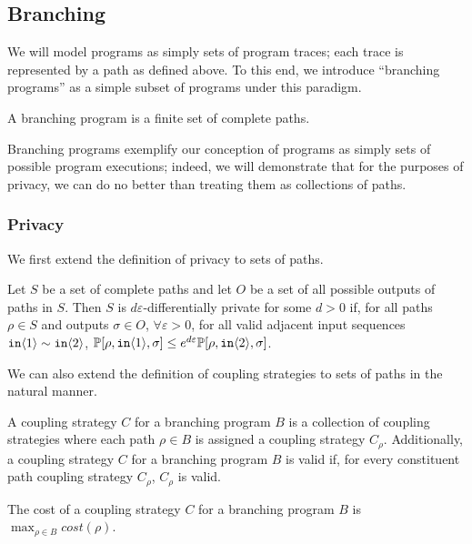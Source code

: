 
\subsection{Branching} 

We will model programs as simply sets of program traces; each trace is represented by a path as defined above. To this end, we introduce ``branching programs'' as a simple subset of programs under this paradigm. 

\begin{defn}
    A branching program is a finite set of complete paths.
\end{defn}

Branching programs exemplify our conception of programs as simply sets of possible program executions; indeed, we will demonstrate that for the purposes of privacy, we can do no better than treating them as collections of paths.

\subsubsection{Privacy}

We first extend the definition of privacy to sets of paths. 

\begin{defn}
    Let $S$ be a set of complete paths and let $O$ be a set of all possible outputs of paths in $S$. 
    Then $S$ is $d\varepsilon$-differentially private for some $d>0$ if, for all paths $\rho\in S$ and outputs $\sigma\in O$, $\forall \varepsilon>0$, for all valid adjacent input sequences $\texttt{in}\langle1 \rangle\sim \texttt{in}\langle2 \rangle$, $\mathbb{P}[\rho, \texttt{in}\langle1 \rangle, \sigma]\leq e^{d\varepsilon}\mathbb{P}[\rho, \texttt{in}\langle2 \rangle, \sigma]$.
\end{defn}

We can also extend the definition of coupling strategies to sets of paths in the natural manner.

\begin{defn}
    A coupling strategy $C$ for a branching program $B$ is a collection of coupling strategies where each path $\rho\in B$ is assigned a coupling strategy $C_\rho$. Additionally, a coupling strategy $C$ for a branching program $B$ is valid if, for every constituent path coupling strategy $C_\rho$, $C_\rho$ is valid. 
\end{defn}

\begin{defn}
    The cost of a coupling strategy $C$ for a branching program $B$ is $\max_{\rho\in B}cost(\rho)$.
\end{defn}

